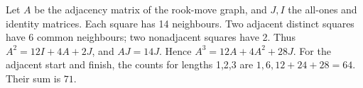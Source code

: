 Let $A$ be the adjacency matrix of the rook-move graph, and $J,I$ the all-ones and identity matrices. Each square has 14 neighbours. Two adjacent distinct squares have 6 common neighbours; two nonadjacent squares have 2. Thus $A^2=12I+4A+2J$, and $AJ=14J$. Hence $A^3=12A+4A^2+28J$. For the adjacent start and finish, the counts for lengths 1,2,3 are $1,6,12+24+28=64$. Their sum is $\boxed{71}$.
